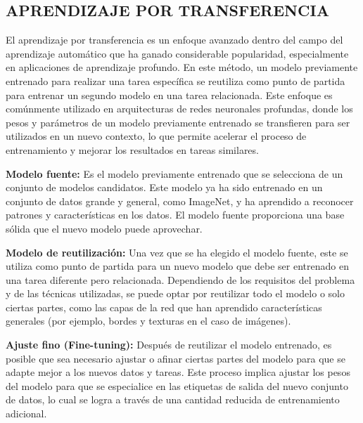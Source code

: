 \subsection{APRENDIZAJE POR TRANSFERENCIA}

El aprendizaje por transferencia es un enfoque avanzado dentro del campo del aprendizaje automático que ha ganado considerable popularidad, especialmente en aplicaciones de aprendizaje profundo. En este método, un modelo previamente entrenado para realizar una tarea específica se reutiliza como punto de partida para entrenar un segundo modelo en una tarea relacionada. Este enfoque es comúnmente utilizado en arquitecturas de redes neuronales profundas, donde los pesos y parámetros de un modelo previamente entrenado se transfieren para ser utilizados en un nuevo contexto, lo que permite acelerar el proceso de entrenamiento y mejorar los resultados en tareas similares.

\textbf{Modelo fuente:} Es el modelo previamente entrenado que se selecciona de un conjunto de modelos candidatos. Este modelo ya ha sido entrenado en un conjunto de datos grande y general, como ImageNet, y ha aprendido a reconocer patrones y características en los datos. El modelo fuente proporciona una base sólida que el nuevo modelo puede aprovechar.

\textbf{Modelo de reutilización:} Una vez que se ha elegido el modelo fuente, este se utiliza como punto de partida para un nuevo modelo que debe ser entrenado en una tarea diferente pero relacionada. Dependiendo de los requisitos del problema y de las técnicas utilizadas, se puede optar por reutilizar todo el modelo o solo ciertas partes, como las capas de la red que han aprendido características generales (por ejemplo, bordes y texturas en el caso de imágenes).

\textbf{Ajuste fino (Fine-tuning):} Después de reutilizar el modelo entrenado, es posible que sea necesario ajustar o afinar ciertas partes del modelo para que se adapte mejor a los nuevos datos y tareas. Este proceso implica ajustar los pesos del modelo para que se especialice en las etiquetas de salida del nuevo conjunto de datos, lo cual se logra a través de una cantidad reducida de entrenamiento adicional.

